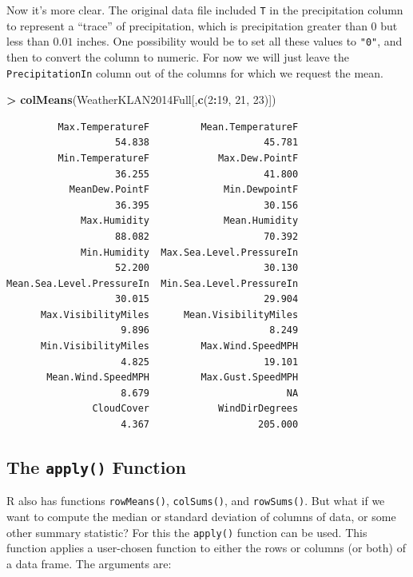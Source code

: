 \documentclass[]{krantz}
\makeatletter
\newenvironment{Shaded}{\begin{snugshade}}{\end{snugshade}}
\newcommand{\KeywordTok}[1]{\textcolor[rgb]{0.27,0.27,0.27}{\textbf{#1}}}
\newcommand{\DecValTok}[1]{\textcolor[rgb]{0.06,0.06,0.06}{#1}}
\newcommand{\StringTok}[1]{\textcolor[rgb]{0.5,0.5,0.5}{#1}}
\newcommand{\OperatorTok}[1]{\textcolor[rgb]{0.43,0.43,0.43}{\textbf{#1}}}
\newcommand{\NormalTok}[1]{#1}
\newenvironment{kframe}{%
\medskip{}
\setlength{\fboxsep}{.8em}
 \def\at@end@of@kframe{}%
 \ifinner\ifhmode%
  \def\at@end@of@kframe{\end{minipage}}%
  \begin{minipage}{\columnwidth}%
 \fi\fi%
 \def\FrameCommand##1{\hskip\@totalleftmargin \hskip-\fboxsep
 \colorbox{shadecolor}{##1}\hskip-\fboxsep
     \hskip-\linewidth \hskip-\@totalleftmargin \hskip\columnwidth}%
 \MakeFramed {\advance\hsize-\width
   \@totalleftmargin\z@ \linewidth\hsize
   \@setminipage}}%
 {\par\unskip\endMakeFramed%
 \at@end@of@kframe}
\renewenvironment{Shaded}{\begin{kframe}}{\end{kframe}}
\makeatother
\begin{document}
Now it's more clear. The original data file included \texttt{T} in the
precipitation column to represent a ``trace'' of precipitation, which is
precipitation greater than \(0\) but less than \(0.01\) inches. One
possibility would be to set all these values to \texttt{"0"}, and then
to convert the column to numeric. For now we will just leave the
\texttt{PrecipitationIn} column out of the columns for which we request
the mean.

\begin{Shaded}
\begin{Highlighting}[]
\OperatorTok{>}\StringTok{ }\KeywordTok{colMeans}\NormalTok{(WeatherKLAN2014Full[,}\KeywordTok{c}\NormalTok{(}\DecValTok{2}\OperatorTok{:}\DecValTok{19}\NormalTok{, }\DecValTok{21}\NormalTok{, }\DecValTok{23}\NormalTok{)])}
\end{Highlighting}
\end{Shaded}

\begin{verbatim}
         Max.TemperatureF         Mean.TemperatureF 
                   54.838                    45.781 
         Min.TemperatureF            Max.Dew.PointF 
                   36.255                    41.800 
           MeanDew.PointF             Min.DewpointF 
                   36.395                    30.156 
             Max.Humidity             Mean.Humidity 
                   88.082                    70.392 
             Min.Humidity  Max.Sea.Level.PressureIn 
                   52.200                    30.130 
Mean.Sea.Level.PressureIn  Min.Sea.Level.PressureIn 
                   30.015                    29.904 
      Max.VisibilityMiles      Mean.VisibilityMiles 
                    9.896                     8.249 
      Min.VisibilityMiles         Max.Wind.SpeedMPH 
                    4.825                    19.101 
       Mean.Wind.SpeedMPH         Max.Gust.SpeedMPH 
                    8.679                        NA 
               CloudCover            WindDirDegrees 
                    4.367                   205.000 
\end{verbatim}

\subsection{\texorpdfstring{The \texttt{apply()}
Function}{The apply() Function}}\label{apply}

R also has functions \texttt{rowMeans()}, \texttt{colSums()}, and
\texttt{rowSums()}. But what if we want to compute the median or
standard deviation of columns of data, or some other summary statistic?
For this the \texttt{apply()} function can be used. This function
applies a user-chosen function to either the rows or columns (or both)
of a data frame. The arguments are:
\end{document}

